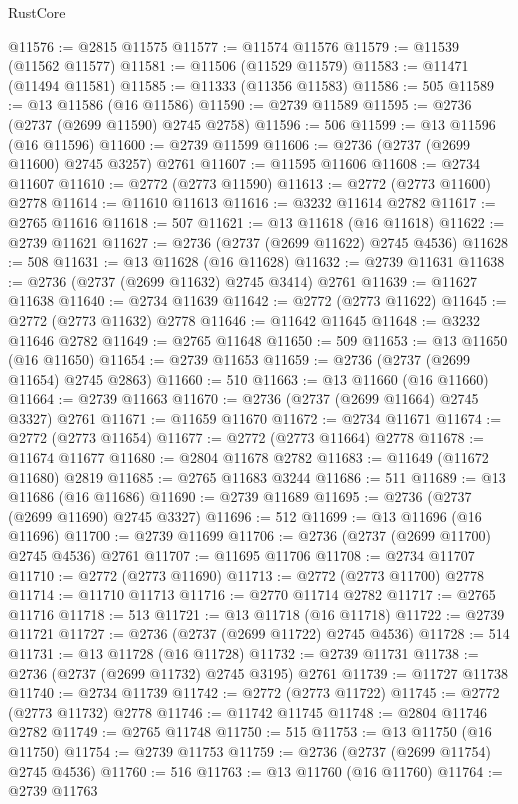 \begin{lexlean}{RustCore}
\begin{coremodule}
@11576 := @2815 @11575
@11577 := @11574 @11576
@11579 := @11539 (@11562 @11577)
@11581 := @11506 (@11529 @11579)
@11583 := @11471 (@11494 @11581)
@11585 := @11333 (@11356 @11583)
@11586 := 505
@11589 := @13 @11586 (@16 @11586)
@11590 := @2739 @11589
@11595 := @2736 (@2737 (@2699 @11590) @2745 @2758)
@11596 := 506
@11599 := @13 @11596 (@16 @11596)
@11600 := @2739 @11599
@11606 := @2736 (@2737 (@2699 @11600) @2745 @3257) @2761
@11607 := @11595 @11606
@11608 := @2734 @11607
@11610 := @2772 (@2773 @11590)
@11613 := @2772 (@2773 @11600) @2778
@11614 := @11610 @11613
@11616 := @3232 @11614 @2782
@11617 := @2765 @11616
@11618 := 507
@11621 := @13 @11618 (@16 @11618)
@11622 := @2739 @11621
@11627 := @2736 (@2737 (@2699 @11622) @2745 @4536)
@11628 := 508
@11631 := @13 @11628 (@16 @11628)
@11632 := @2739 @11631
@11638 := @2736 (@2737 (@2699 @11632) @2745 @3414) @2761
@11639 := @11627 @11638
@11640 := @2734 @11639
@11642 := @2772 (@2773 @11622)
@11645 := @2772 (@2773 @11632) @2778
@11646 := @11642 @11645
@11648 := @3232 @11646 @2782
@11649 := @2765 @11648
@11650 := 509
@11653 := @13 @11650 (@16 @11650)
@11654 := @2739 @11653
@11659 := @2736 (@2737 (@2699 @11654) @2745 @2863)
@11660 := 510
@11663 := @13 @11660 (@16 @11660)
@11664 := @2739 @11663
@11670 := @2736 (@2737 (@2699 @11664) @2745 @3327) @2761
@11671 := @11659 @11670
@11672 := @2734 @11671
@11674 := @2772 (@2773 @11654)
@11677 := @2772 (@2773 @11664) @2778
@11678 := @11674 @11677
@11680 := @2804 @11678 @2782
@11683 := @11649 (@11672 @11680) @2819
@11685 := @2765 @11683 @3244
@11686 := 511
@11689 := @13 @11686 (@16 @11686)
@11690 := @2739 @11689
@11695 := @2736 (@2737 (@2699 @11690) @2745 @3327)
@11696 := 512
@11699 := @13 @11696 (@16 @11696)
@11700 := @2739 @11699
@11706 := @2736 (@2737 (@2699 @11700) @2745 @4536) @2761
@11707 := @11695 @11706
@11708 := @2734 @11707
@11710 := @2772 (@2773 @11690)
@11713 := @2772 (@2773 @11700) @2778
@11714 := @11710 @11713
@11716 := @2770 @11714 @2782
@11717 := @2765 @11716
@11718 := 513
@11721 := @13 @11718 (@16 @11718)
@11722 := @2739 @11721
@11727 := @2736 (@2737 (@2699 @11722) @2745 @4536)
@11728 := 514
@11731 := @13 @11728 (@16 @11728)
@11732 := @2739 @11731
@11738 := @2736 (@2737 (@2699 @11732) @2745 @3195) @2761
@11739 := @11727 @11738
@11740 := @2734 @11739
@11742 := @2772 (@2773 @11722)
@11745 := @2772 (@2773 @11732) @2778
@11746 := @11742 @11745
@11748 := @2804 @11746 @2782
@11749 := @2765 @11748
@11750 := 515
@11753 := @13 @11750 (@16 @11750)
@11754 := @2739 @11753
@11759 := @2736 (@2737 (@2699 @11754) @2745 @4536)
@11760 := 516
@11763 := @13 @11760 (@16 @11760)
@11764 := @2739 @11763

\end{coremodule}
\end{lexlean}
